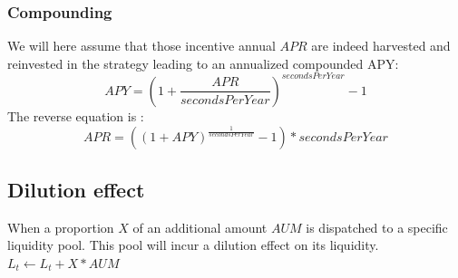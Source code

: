 \documentclass[conference]{IEEEtran}
\begin{document}
\subsubsection{Compounding}
We will here assume that those incentive annual $APR$ are indeed harvested and reinvested in the strategy leading to an annualized compounded APY:
\begin{equation}\label{eq:APRtoAPY}
APY = (1+ \frac{APR}{secondsPerYear})^{secondsPerYear}-1
\end{equation}
The reverse equation is :
\begin{equation}
APR = ((1+ APY)^{\frac{1}{secondsPerYear}}-1)*secondsPerYear
\end{equation}


\subsection{Dilution effect}
When a proportion $X$ of an additional amount $AUM$ is dispatched to a specific liquidity pool. This pool will incur a dilution effect on its liquidity.\\
$L_t \leftarrow L_t + X*AUM$\\
\end{document}
